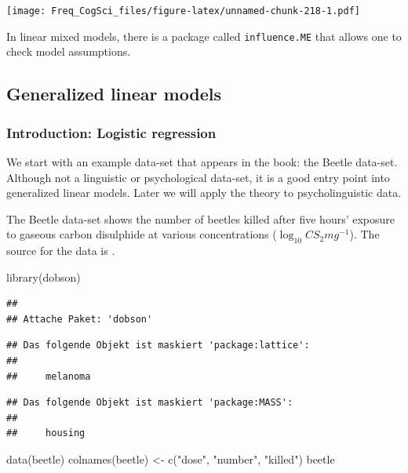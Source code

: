 \documentclass[
  12pt,
]{krantz}
\newenvironment{Shaded}{\begin{snugshade}}{\end{snugshade}}
\newcommand{\FunctionTok}[1]{\textcolor[rgb]{0.00,0.00,0.00}{#1}}
\newcommand{\NormalTok}[1]{#1}
\newcommand{\OtherTok}[1]{\textcolor[rgb]{0.56,0.35,0.01}{#1}}
\newcommand{\StringTok}[1]{\textcolor[rgb]{0.31,0.60,0.02}{#1}}
\theoremstyle{definition}
\theoremstyle{definition}
\theoremstyle{definition}
\theoremstyle{definition}
\theoremstyle{remark}
\begin{document}
\texttt{[image: Freq\_CogSci\_files/figure-latex/unnamed-chunk-218-1.pdf]}

In linear mixed models, there is a package called \texttt{influence.ME} \citep{influenceme} that allows one to check model assumptions.

\hypertarget{generalized-linear-models}{%
\subsection{Generalized linear models}\label{generalized-linear-models}}

\hypertarget{introduction-logistic-regression}{%
\subsubsection{Introduction: Logistic regression}\label{introduction-logistic-regression}}

We start with an example data-set that appears in the \citet{dobson2011introduction} book: the Beetle data-set. Although not a linguistic or psychological data-set, it is a good entry point into generalized linear models. Later we will apply the theory to psycholinguistic data.

The Beetle data-set shows the number of beetles killed after five hours' exposure to gaseous carbon disulphide at various concentrations (\(\log_{10}CS_2 mg^{-1}\)). The source for the data is \citet{bliss1935calculation}.

\begin{Shaded}
\begin{Highlighting}[]
\FunctionTok{library}\NormalTok{(dobson)}
\end{Highlighting}
\end{Shaded}

\begin{verbatim}
## 
## Attache Paket: 'dobson'
\end{verbatim}

\begin{verbatim}
## Das folgende Objekt ist maskiert 'package:lattice':
## 
##     melanoma
\end{verbatim}

\begin{verbatim}
## Das folgende Objekt ist maskiert 'package:MASS':
## 
##     housing
\end{verbatim}

\begin{Shaded}
\begin{Highlighting}[]
\FunctionTok{data}\NormalTok{(beetle)}
\FunctionTok{colnames}\NormalTok{(beetle) }\OtherTok{\textless{}{-}} \FunctionTok{c}\NormalTok{(}\StringTok{"dose"}\NormalTok{, }\StringTok{"number"}\NormalTok{, }\StringTok{"killed"}\NormalTok{)}
\NormalTok{beetle}
\end{Highlighting}
\end{Shaded}
\end{document}
